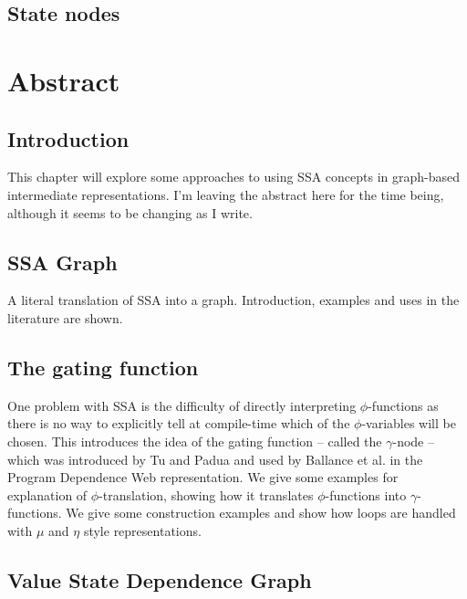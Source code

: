 \subsection{State nodes}




\newpage

\section*{Abstract}

\subsection*{Introduction}

This chapter will explore some approaches to using SSA concepts in graph-based intermediate representations. I'm leaving the abstract here for the time being, although it seems to be changing as I write.

\subsection*{SSA Graph}

A literal translation of SSA into a graph. Introduction, examples and uses in the literature are shown.

\subsection*{The gating function}

One problem with SSA is the difficulty of directly interpreting $\phi$-functions as there is no way to explicitly tell at compile-time which of the $\phi$-variables will be chosen. This introduces the idea of the gating function -- called the $\gamma$-node -- which was introduced by Tu and Padua \cite{207115} and used by Ballance et al. in the Program Dependence Web\cite{93578} representation. We give some examples for explanation of $\phi$-translation, showing how it translates $\phi$-functions into $\gamma$-functions.
We give some construction examples and show how loops are handled with $\mu$ and $\eta$ style representations.

\subsection*{Value State Dependence Graph}

